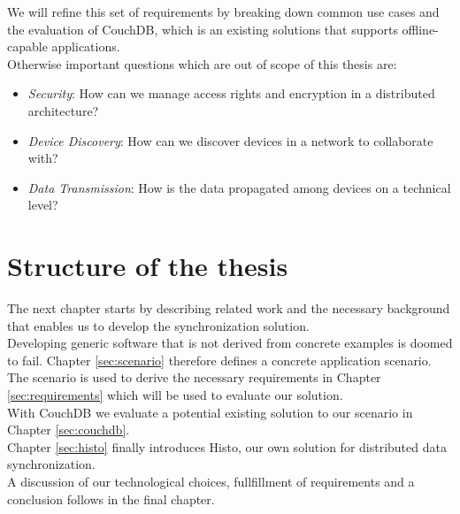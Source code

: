We will refine this set of requirements by breaking down common use cases and the evaluation of CouchDB, which is an existing solutions that supports offline-capable applications.\\

Otherwise important questions which are out of scope of this thesis are:

\begin{itemize}
\item \emph{Security}: How can we manage access rights and encryption in a distributed architecture?
\item \emph{Device Discovery}: How can we discover devices in a network to collaborate with?
\item \emph{Data Transmission}: How is the data propagated among devices on a technical level?
\end{itemize}

\section{Structure of the thesis}
The next chapter starts by describing related work and the necessary background that enables us to develop the synchronization solution.\\
Developing generic software that is not derived from concrete examples is doomed to fail.
Chapter \ref{sec:scenario} therefore defines a concrete application scenario.\\
The scenario is used to derive the necessary requirements in Chapter \ref{sec:requirements} which will be used to evaluate our solution.\\
With CouchDB we evaluate a potential existing solution to our scenario in Chapter \ref{sec:couchdb}.\\
Chapter \ref{sec:histo} finally introduces Histo, our own solution for distributed data synchronization.\\
A discussion of our technological choices, fullfillment of requirements and a conclusion follows in the final chapter.
